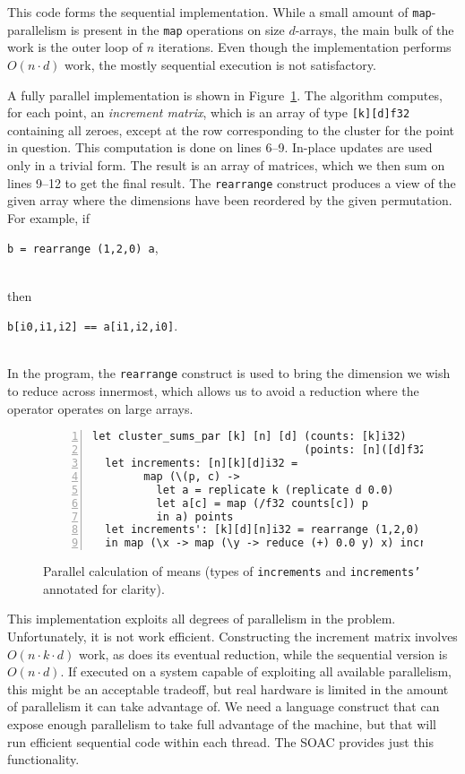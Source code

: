 This code forms the sequential implementation.  While a small amount
of \texttt{map}-parallelism is present in the \texttt{map} operations
on size $d$-arrays, the main bulk of the work is the outer loop of $n$
iterations.  Even though the implementation performs $O(n\cdot{}d)$
work, the mostly sequential execution is not satisfactory.

A fully parallel implementation is shown in
Figure~\ref{fig:parallel-means}.  The algorithm computes, for each
point, an \textit{increment matrix}, which is an array of type
\texttt{[k][d]f32} containing all zeroes, except at the row
corresponding to the cluster for the point in question.  This
computation is done on lines 6--9.  In-place updates are used only in
a trivial form.  The result is an array of matrices, which we then sum
on lines 9--12 to get the final result.  The \texttt{rearrange}
construct produces a view of the given
array where the dimensions have been reordered by the given permutation.  For example, if\\
\centerline{\texttt{b = rearrange (1,2,0) a},}\\
then\\
\centerline{\texttt{b[i0,i1,i2] == a[i1,i2,i0]}.}\\
In the program, the \texttt{rearrange} construct is used to bring the
dimension we wish to reduce across innermost, which allows us to avoid
a reduction where the operator operates on large arrays.

\begin{figure}
\begin{lstlisting}[basicstyle=\small\ttfamily,numbers=left]
let cluster_sums_par [k] [n] [d] (counts: [k]i32)
                                 (points: [n]([d]f32,i32)): *[k][d]f32 =
  let increments: [n][k][d]i32 =
        map (\(p, c) ->
          let a = replicate k (replicate d 0.0)
          let a[c] = map (/f32 counts[c]) p
          in a) points
  let increments': [k][d][n]i32 = rearrange (1,2,0) increments
  in map (\x -> map (\y -> reduce (+) 0.0 y) x) increments'
\end{lstlisting}
  \caption{Parallel calculation of means (types of \texttt{increments}
    and \texttt{increments'} annotated for clarity).}
\label{fig:parallel-means}
\end{figure}

This implementation exploits all degrees of parallelism in the
problem.  Unfortunately, it is not work efficient.  Constructing the
increment matrix involves $O(n\cdot{}k\cdot{}d)$ work, as does its
eventual reduction, while the sequential version is $O(n\cdot{}d)$.
If executed on a system capable of exploiting all available
parallelism, this might be an acceptable tradeoff, but real hardware
is limited in the amount of parallelism it can take advantage of.  We
need a language construct that can expose enough parallelism to take
full advantage of the machine, but that will run efficient sequential
code within each thread.  The \StreamRed{} SOAC provides
just this functionality.

